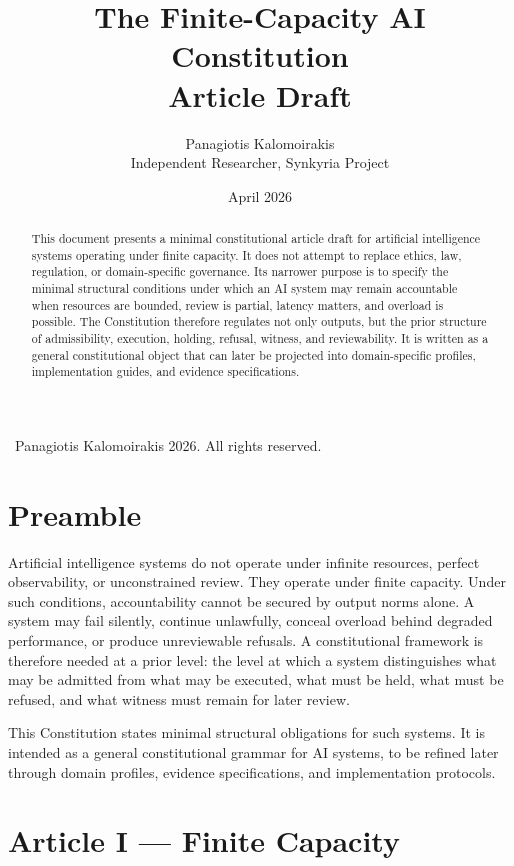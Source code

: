 \documentclass[11pt]{article}
\title{The Finite-Capacity AI Constitution\\
Article Draft}
\author{Panagiotis Kalomoirakis\\
Independent Researcher, Synkyria Project}
\date{April 2026}
\begin{document}
\maketitle

\begin{center}
\small \textcopyright\ Panagiotis Kalomoirakis 2026. All rights reserved.
\end{center}

\begin{abstract}
This document presents a minimal constitutional article draft for artificial intelligence systems operating under finite capacity. It does not attempt to replace ethics, law, regulation, or domain-specific governance. Its narrower purpose is to specify the minimal structural conditions under which an AI system may remain accountable when resources are bounded, review is partial, latency matters, and overload is possible. The Constitution therefore regulates not only outputs, but the prior structure of admissibility, execution, holding, refusal, witness, and reviewability. It is written as a general constitutional object that can later be projected into domain-specific profiles, implementation guides, and evidence specifications.
\end{abstract}

\section*{Preamble}

Artificial intelligence systems do not operate under infinite resources, perfect observability, or unconstrained review. They operate under finite capacity. Under such conditions, accountability cannot be secured by output norms alone. A system may fail silently, continue unlawfully, conceal overload behind degraded performance, or produce unreviewable refusals. A constitutional framework is therefore needed at a prior level: the level at which a system distinguishes what may be admitted from what may be executed, what must be held, what must be refused, and what witness must remain for later review.

This Constitution states minimal structural obligations for such systems. It is intended as a general constitutional grammar for AI systems, to be refined later through domain profiles, evidence specifications, and implementation protocols.

\section*{Article I --- Finite Capacity}
\end{document}

